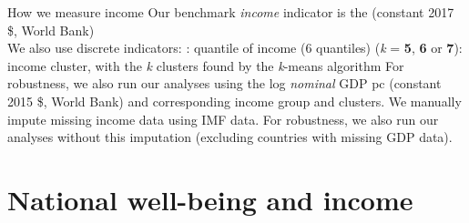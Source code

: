 \documentclass[aspectratio=169,xcolor=dvipsnames, 11pt,mathserif]{beamer}
\begin{document}
\begin{frame}{How we measure income}    
    \bbvsp %
    \ip Our benchmark \textit{income} indicator is the  (constant 2017 \$, World Bank) \pause \\ We also use discrete indicators: \pause \bbvsp
    \ip \textbf{}: quantile of income (6 quantiles)
    \ip \textbf{} (\textit{k} = \textbf{5}, \textbf{6} or \textbf{7}): income cluster, with the \textit{k} clusters found by the \textit{k}-means algorithm
    \ee
    \ip For robustness, we also run our analyses using the log \textit{nominal} GDP pc (constant 2015 \$, World Bank) and corresponding income group and clusters.
    \ip We manually impute missing income data using IMF data.
    \bbvsp \ip For robustness, we also run our analyses without this imputation (excluding countries with missing GDP data).
    \ee
    \ee 
\end{frame}

\section{National well-being and income}
\end{document}
